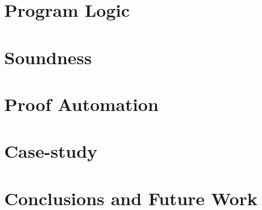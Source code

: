 \documentclass[sigplan,10pt,review]{acmart}\settopmatter{printfolios=true,printccs=false,printacmref=false}
\begin{document}
\section{Program Logic}
\label{sec:logic}


\section{Soundness}
\label{sec:sound}


\section{Proof Automation}
\label{sec:auto}


\section{Case-study}
\label{sec:case}


\section{Conclusions and Future Work}
\label{sec:concl}






\end{document}
